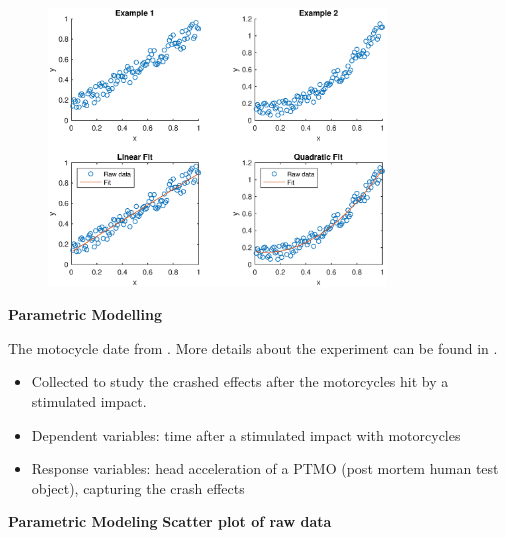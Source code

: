 \documentclass[19pt,landscaoe]{article}
\begin{document}
\begin{figure}[h]

      \includegraphics[width=0.8\textwidth,height=0.5\textwidth]{figure1.eps}
    \label{figure1} 

\end{figure}

\newpage
{\LARGE{\textbf{Parametric Modelling}}}
\vskip25pt
\begin{minipage}{.9\textwidth}
    \Large{The motocycle date from \cite{Silverman85a}. More details about the experiment can be found in \cite{schmidt81}.}
\begin{itemize}
\item Collected to study the crashed effects after the motorcycles hit by a stimulated impact. 
\item Dependent variables: time after a stimulated impact with motorcycles
\item Response variables: head acceleration of a PTMO (post mortem human test object), capturing the crash effects

\end{itemize}
\end{minipage}

\newpage
{\LARGE{\textbf{Parametric Modeling}}}
\vskip25pt
{\Large\bf{Scatter plot of raw data}}
\end{document}
